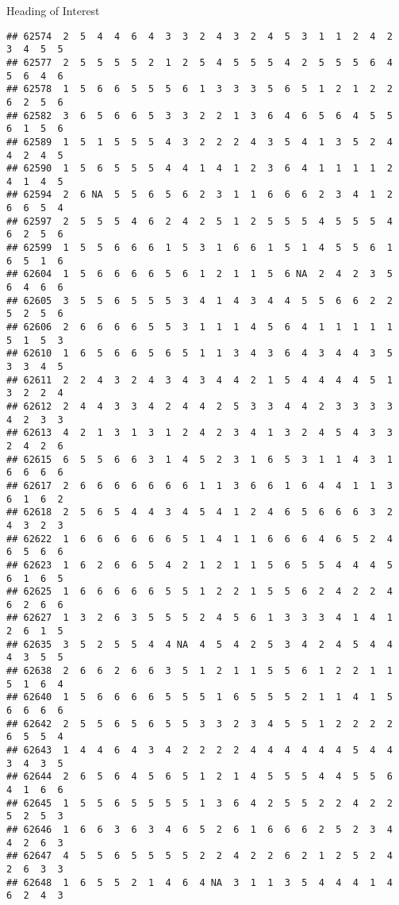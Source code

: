 \documentclass[
  ignorenonframetext,
]{beamer}
\begin{document}
\begin{frame}[fragile]{Heading of Interest}
\begin{verbatim}
## 62574  2  5  4  4  6  4  3  3  2  4  3  2  4  5  3  1  1  2  4  2  3  4  5  5
## 62577  2  5  5  5  5  2  1  2  5  4  5  5  5  4  2  5  5  5  6  4  5  6  4  6
## 62578  1  5  6  6  5  5  5  6  1  3  3  3  5  6  5  1  2  1  2  2  6  2  5  6
## 62582  3  6  5  6  6  5  3  3  2  2  1  3  6  4  6  5  6  4  5  5  6  1  5  6
## 62589  1  5  1  5  5  5  4  3  2  2  2  4  3  5  4  1  3  5  2  4  4  2  4  5
## 62590  1  5  6  5  5  5  4  4  1  4  1  2  3  6  4  1  1  1  1  2  4  1  4  5
## 62594  2  6 NA  5  5  6  5  6  2  3  1  1  6  6  6  2  3  4  1  2  6  6  5  4
## 62597  2  5  5  5  4  6  2  4  2  5  1  2  5  5  5  4  5  5  5  4  6  2  5  6
## 62599  1  5  5  6  6  6  1  5  3  1  6  6  1  5  1  4  5  5  6  1  6  5  1  6
## 62604  1  5  6  6  6  6  5  6  1  2  1  1  5  6 NA  2  4  2  3  5  6  4  6  6
## 62605  3  5  5  6  5  5  5  3  4  1  4  3  4  4  5  5  6  6  2  2  5  2  5  6
## 62606  2  6  6  6  6  5  5  3  1  1  1  4  5  6  4  1  1  1  1  1  5  1  5  3
## 62610  1  6  5  6  6  5  6  5  1  1  3  4  3  6  4  3  4  4  3  5  3  3  4  5
## 62611  2  2  4  3  2  4  3  4  3  4  4  2  1  5  4  4  4  4  5  1  3  2  2  4
## 62612  2  4  4  3  3  4  2  4  4  2  5  3  3  4  4  2  3  3  3  3  4  2  3  3
## 62613  4  2  1  3  1  3  1  2  4  2  3  4  1  3  2  4  5  4  3  3  2  4  2  6
## 62615  6  5  5  6  6  3  1  4  5  2  3  1  6  5  3  1  1  4  3  1  6  6  6  6
## 62617  2  6  6  6  6  6  6  6  1  1  3  6  6  1  6  4  4  1  1  3  6  1  6  2
## 62618  2  5  6  5  4  4  3  4  5  4  1  2  4  6  5  6  6  6  3  2  4  3  2  3
## 62622  1  6  6  6  6  6  6  5  1  4  1  1  6  6  6  4  6  5  2  4  6  5  6  6
## 62623  1  6  2  6  6  5  4  2  1  2  1  1  5  6  5  5  4  4  4  5  6  1  6  5
## 62625  1  6  6  6  6  6  5  5  1  2  2  1  5  5  6  2  4  2  2  4  6  2  6  6
## 62627  1  3  2  6  3  5  5  5  2  4  5  6  1  3  3  3  4  1  4  1  2  6  1  5
## 62635  3  5  2  5  5  4  4 NA  4  5  4  2  5  3  4  2  4  5  4  4  4  3  5  5
## 62638  2  6  6  2  6  6  3  5  1  2  1  1  5  5  6  1  2  2  1  1  5  1  6  4
## 62640  1  5  6  6  6  6  5  5  5  1  6  5  5  5  2  1  1  4  1  5  6  6  6  6
## 62642  2  5  5  6  5  6  5  5  3  3  2  3  4  5  5  1  2  2  2  2  6  5  5  4
## 62643  1  4  4  6  4  3  4  2  2  2  2  4  4  4  4  4  4  5  4  4  3  4  3  5
## 62644  2  6  5  6  4  5  6  5  1  2  1  4  5  5  5  4  4  5  5  6  4  1  6  6
## 62645  1  5  5  6  5  5  5  5  1  3  6  4  2  5  5  2  2  4  2  2  5  2  5  3
## 62646  1  6  6  3  6  3  4  6  5  2  6  1  6  6  6  2  5  2  3  4  4  2  6  3
## 62647  4  5  5  6  5  5  5  5  2  2  4  2  2  6  2  1  2  5  2  4  2  6  3  3
## 62648  1  6  5  5  2  1  4  6  4 NA  3  1  1  3  5  4  4  4  1  4  6  2  4  3

\end{verbatim}
\end{frame}
\end{document}

